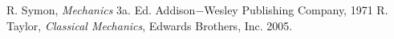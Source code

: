 %
%
%
%
%
%
%
%
%
%
%
%
%
%
%
%
%
%
%







\nocite{*}
%
%

\begin{thebibliography}{00}
 R. Symon, \textit{Mechanics} 3a. Ed. Addison$-$Wesley Publishing Company, 1971
 R. Taylor, \textit{Classical Mechanics}, Edwards Brothers, Inc. 2005.
\end{thebibliography}






